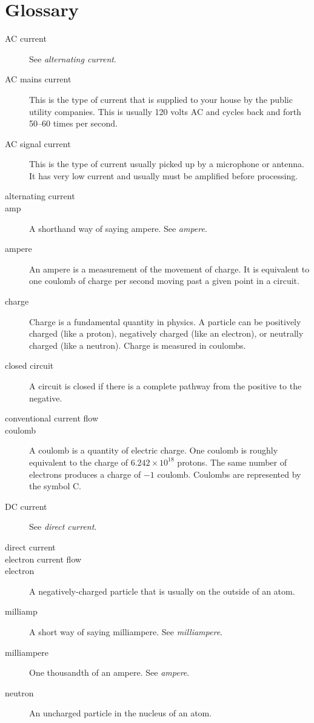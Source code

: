 \chapter{Glossary}
\label{chapGlossary}

\begin{description}
\item[AC current] See \emph{alternating current}.
\item[AC mains current] This is the type of current that is supplied to your house by the public utility companies.  This is usually 120 volts AC and cycles back and forth 50--60 times per second.
\item[AC signal current] This is the type of current usually picked up by a microphone or antenna.  It has very low current and usually must be amplified before processing.
\item[alternating current]
\item[amp] A shorthand way of saying ampere.  See \emph{ampere}.
\item[ampere] An ampere is a measurement of the movement of charge.  It is equivalent to one coulomb of charge per second moving past a given point in a circuit.
\item[charge] Charge is a fundamental quantity in physics.  A particle can be positively charged (like a proton), negatively charged (like an electron), or neutrally charged (like a neutron).  Charge is measured in coulombs.
\item[closed circuit] A circuit is closed if there is a complete pathway from the positive to the negative.
\item[conventional current flow]
\item[coulomb] A coulomb is a quantity of electric charge.  One coulomb is roughly equivalent to the charge of $6.242×10^18$ protons.  The same number of electrons produces a charge of $-1$ coulomb.  Coulombs are represented by the symbol C.
\item[DC current] See \emph{direct current}.
\item[direct current]
\item[electron current flow]
\item[electron] A negatively-charged particle that is usually on the outside of an atom.
\item[milliamp] A short way of saying milliampere.  See \emph{milliampere}.
\item[milliampere] One thousandth of an ampere.  See \emph{ampere}.
\item[neutron] An uncharged particle in the nucleus of an atom.

\end{description}
